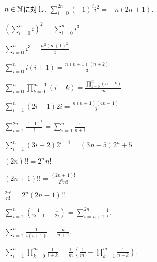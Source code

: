 \begin{prop}
  $n\in\mathbb{N}$に対し, $\sum_{i=0}^{2n}(-1)^ii^2=-n(2n+1)$.
\end{prop}

\begin{prop}
  $\left(\sum_{i=0}^n i\right)^2=\sum_{i=0}^n i^3$
\end{prop}

\begin{prop}
  $\sum_{i=0}^n i^3=\frac{n^2(n+1)^2}{4}$
\end{prop}

\begin{prop}
  $\sum_{i=0}^n i(i+1)=\frac{n(n+1)(n+2)}{3}$
\end{prop}

\begin{prop}
  $\sum_{i=0}^n \prod_{k=0}^{m-1}(i+k)=\frac{\prod_{k=0}^{m}(n+k)}{m}$
\end{prop}

\begin{prop}
  $\sum_{i=1}^n (2i-1)2i=\frac{n(n+1)(4n-1)}{3}$
\end{prop}

\begin{prop}
  $\sum_{i=1}^{2n}\frac{(-1)^i}{i}=\sum_{i=1}^n\frac{1}{n+i}$
\end{prop}

\begin{prop}
  $\sum_{i=1}^n (3i-2)2^{i-1}=(3n-5)2^n+5$
\end{prop}



\begin{prop}
  $(2n)!!=2^nn!$
\end{prop}
\begin{prop}
  $(2n+1)!!=\frac{(2n+1)!}{2^nn!}$
\end{prop}
\begin{prop}
  $\frac{2n!}{n!}=2^n(2n-1)!!$
\end{prop}

\begin{prop}
  $\sum_{i=1}^n\left( \frac{1}{2i-1}-\frac{1}{2i}\right)=\sum_{i=n+1}^{2n}\frac{1}{i}$.
\end{prop}

\begin{prop}
  $\sum_{i=1}^n\frac{1}{i(i+1)}=\frac{n}{n+1}$.
\end{prop}

\begin{prop}
  $\sum_{i=1}^n\prod_{k=0}^{m}\frac{1}{i+k}=\frac{1}{m}\left(\frac{1}{m!}-\prod_{k=1}^m\frac{1}{n+k}\right)$.
\end{prop}


